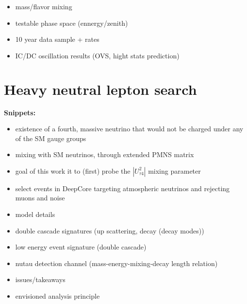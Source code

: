 \documentclass[a4paper,11pt]{article}
\begin{document}
\begin{itemize}
    \item mass/flavor mixing
    \item testable phase space (ennergy/zenith)
    \item 10 year data sample + rates
    \item IC/DC oscillation results (OVS, hight stats prediction)
\end{itemize}


\section{Heavy neutral lepton search}

\textbf{Snippets:}
\begin{itemize}
    \item existence of a fourth, massive neutrino that would not be charged under any of the SM gauge groups
    \item mixing with SM neutrinos, through extended PMNS matrix
    \item goal of this work it to (first) probe the $|U_{\tau4}^2|$ mixing parameter
    \item select events in DeepCore targeting atmospheric neutrinos and rejecting muons and noise
\end{itemize}




\begin{itemize}
    \item model details
    \item double cascade signatures (up scattering, decay (decay modes))
    \item low energy event signature (double cascade)
    \item nutau detection channel (mass-energy-mixing-decay length relation)
    \item issues/takeaways
    \item envisioned analysis principle
\end{itemize}






\footnotesize


\end{document}
